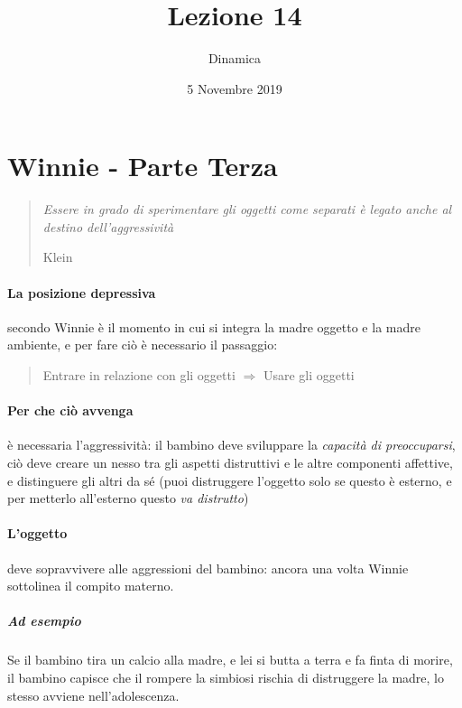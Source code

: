 \documentclass[12pt, a4paper]{article}
\date{5 Novembre 2019}
\title{Lezione 14}
\author{Dinamica}
\begin{document}
\maketitle

\section{Winnie - Parte Terza}

\begin{quote}
    \emph{Essere in grado di sperimentare gli oggetti come separati \`e legato anche al destino dell'aggressivit\`a}
    \begin{flushright}
        Klein
    \end{flushright}
\end{quote}

\paragraph{La posizione depressiva} secondo Winnie \`e il momento in cui si integra la madre oggetto e la madre ambiente, e per fare ciò \`e necessario il passaggio:

\begin{quote}
    \begin{center}
        Entrare in relazione con gli oggetti $\Rightarrow$ Usare gli oggetti
    \end{center}
\end{quote}

\paragraph{Per che ciò avvenga} \`e necessaria l'aggressivit\`a: il bambino deve sviluppare la \emph{capacit\`a di preoccuparsi}, ciò deve creare un nesso tra gli aspetti distruttivi e le altre componenti affettive, e distinguere gli altri da s\'e (puoi distruggere l'oggetto solo se questo \`e esterno, e per metterlo all'esterno questo \emph{va distrutto})

\paragraph{L'oggetto} deve sopravvivere alle aggressioni del bambino: ancora una volta Winnie sottolinea il compito materno.

\subparagraph{Ad esempio} Se il bambino tira un calcio alla madre, e lei si butta a terra e fa finta di morire, il bambino capisce che il rompere la simbiosi rischia di distruggere la madre, lo stesso avviene nell'adolescenza.
\end{document}

